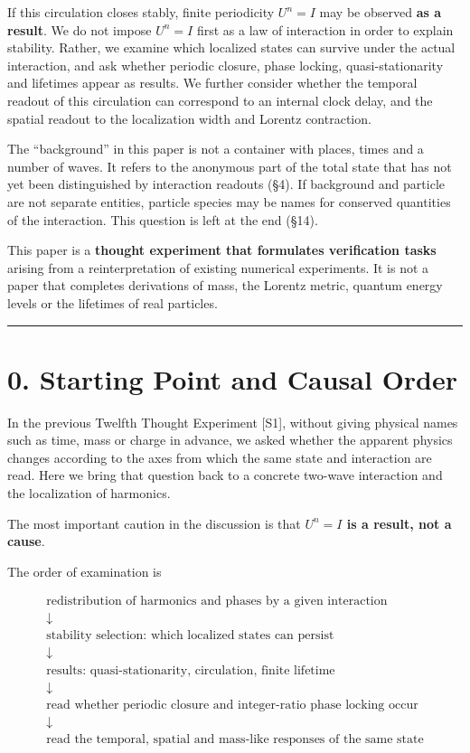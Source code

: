 \documentclass[
  a4paper,
]{article}
\begin{document}
If this circulation closes stably, finite periodicity \(U^n=I\) may be
observed \textbf{as a result}. We do not impose \(U^n=I\) first as a law
of interaction in order to explain stability. Rather, we examine which
localized states can survive under the actual interaction, and ask
whether periodic closure, phase locking, quasi-stationarity and
lifetimes appear as results. We further consider whether the temporal
readout of this circulation can correspond to an internal clock delay,
and the spatial readout to the localization width and Lorentz
contraction.

The ``background'' in this paper is not a container with places, times
and a number of waves. It refers to the anonymous part of the total
state that has not yet been distinguished by interaction readouts (§4).
If background and particle are not separate entities, particle species
may be names for conserved quantities of the interaction. This question
is left at the end (§14).

This paper is a \textbf{thought experiment that formulates verification
tasks} arising from a reinterpretation of existing numerical
experiments. It is not a paper that completes derivations of mass, the
Lorentz metric, quantum energy levels or the lifetimes of real
particles.

\begin{center}\rule{0.5\linewidth}{0.5pt}\end{center}

\section{0. Starting Point and Causal
Order}\label{starting-point-and-causal-order}

In the previous Twelfth Thought Experiment {[}S1{]}, without giving
physical names such as time, mass or charge in advance, we asked whether
the apparent physics changes according to the axes from which the same
state and interaction are read. Here we bring that question back to a
concrete two-wave interaction and the localization of harmonics.

The most important caution in the discussion is that \textbf{\(U^n=I\)
is a result, not a cause}.

The order of examination is

\[
\begin{gathered}
\text{redistribution of harmonics and phases by a given interaction}\\
\downarrow\\
\text{stability selection: which localized states can persist}\\
\downarrow\\
\text{results: quasi-stationarity, circulation, finite lifetime}\\
\downarrow\\
\text{read whether periodic closure and integer-ratio phase locking occur}\\
\downarrow\\
\text{read the temporal, spatial and mass-like responses of the same state}
\end{gathered}
\]
\end{document}
